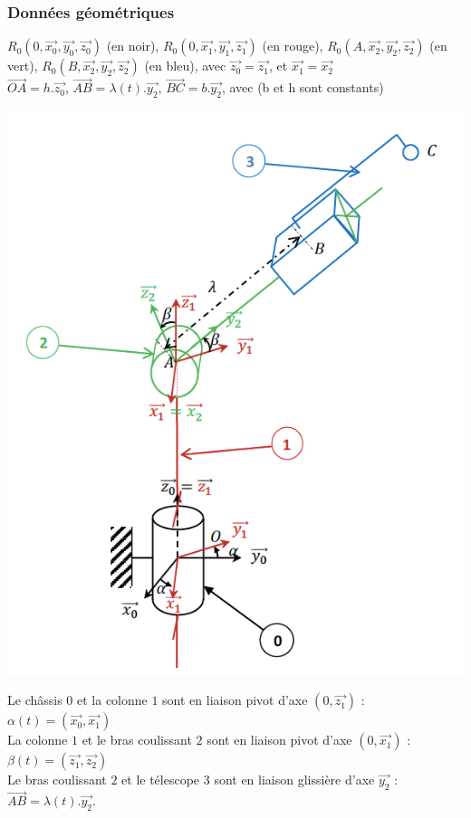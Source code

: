 \subsubsection{Données géométriques}
$R_0(0,\overrightarrow{x_0},\overrightarrow{y_0},\overrightarrow{z_0})$ (en noir), 
$R_0(0,\overrightarrow{x_1},\overrightarrow{y_1},\overrightarrow{z_1})$ (en rouge), 
$R_0(A,\overrightarrow{x_2},\overrightarrow{y_2},\overrightarrow{z_2})$ (en vert), 
$R_0(B,\overrightarrow{x_2},\overrightarrow{y_2},\overrightarrow{z_2})$ (en bleu), 
avec $\overrightarrow{z_0}=\overrightarrow{z_1}$, et $\overrightarrow{x_1}=\overrightarrow{x_2}$\\
$\overrightarrow{OA}=h.\overrightarrow{z_0}$, $\overrightarrow{AB}=\lambda(t).\overrightarrow{y_2}$, $\overrightarrow{BC}=b.\overrightarrow{y_2}$, avec (b et h sont constants)

\begin{center}
    \includegraphics[scale=0.35]{png/2_exo8.png}
\end{center}

Le châssis $0$ et la colonne $1$ sont en liaison pivot d’axe $(0,\overrightarrow{z_1})$ : $\alpha(t)=(\overrightarrow{x_0},\overrightarrow{x_1})$\\
La colonne $1$ et le bras coulissant $2$ sont en liaison pivot d’axe $(0,\overrightarrow{x_1})$ : $\beta(t)=(\overrightarrow{z_1},\overrightarrow{z_2})$\\
Le bras coulissant $2$ et le télescope $3$ sont en liaison glissière d’axe $\overrightarrow{y_2}$ : $\overrightarrow{AB}=\lambda(t).\overrightarrow{y_2}$.\\

